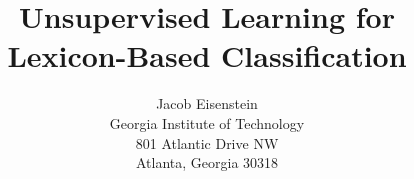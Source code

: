\documentclass[letterpaper]{article}
\def\thetitle{Unsupervised Learning for Lexicon-Based Classification}
\def\theauthor{Jacob Eisenstein}
\begin{document}
%
\title{\thetitle}
\author{\theauthor\\
Georgia Institute of Technology\\
801 Atlantic Drive NW\\
Atlanta, Georgia 30318\\
}
\maketitle


\appendix




\end{document}
